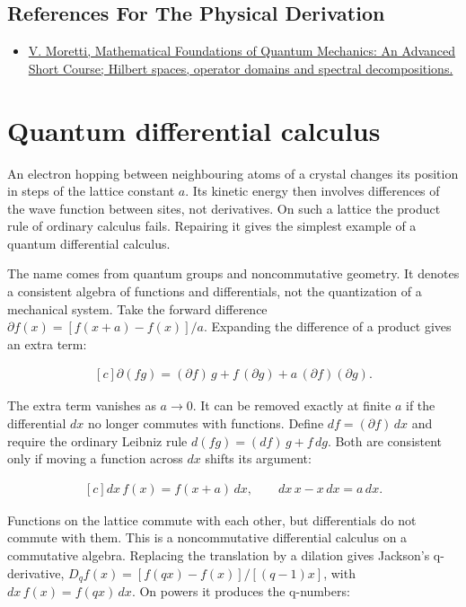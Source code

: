 \documentclass[11pt,oneside]{book}
\newenvironment{centeredalign}{\[\begin{gathered}[c]}{\end{gathered}\]}
\begin{document}
\subsection*{References For The Physical Derivation}
\begin{itemize}
\item \href{https://arxiv.org/abs/1508.06951}{V. Moretti, Mathematical Foundations of Quantum Mechanics: An Advanced Short Course; Hilbert spaces, operator domains and spectral decompositions.}
\end{itemize}





\clearpage

\section{Quantum differential calculus}

\label{topic:quantum-differential-calculus}

An electron hopping between neighbouring atoms of a crystal changes its position in steps of the lattice constant \(a\). Its kinetic energy then involves differences of the wave function between sites, not derivatives. On such a lattice the product rule of ordinary calculus fails. Repairing it gives the simplest example of a quantum differential calculus.

The name comes from quantum groups and noncommutative geometry. It denotes a consistent algebra of functions and differentials, not the quantization of a mechanical system. Take the forward difference \(\partial f(x)=[f(x+a)-f(x)]/a\). Expanding the difference of a product gives an extra term:

\begin{centeredalign}
\partial(fg)=(\partial f)\,g+f\,(\partial g)+a\,(\partial f)(\partial g).
\end{centeredalign}

The extra term vanishes as \(a\to0\). It can be removed exactly at finite \(a\) if the differential \(dx\) no longer commutes with functions. Define \(df=(\partial f)\,dx\) and require the ordinary Leibniz rule \(d(fg)=(df)\,g+f\,dg\). Both are consistent only if moving a function across \(dx\) shifts its argument:

\begin{centeredalign}
dx\,f(x)=f(x+a)\,dx,\qquad dx\,x-x\,dx=a\,dx.
\end{centeredalign}

Functions on the lattice commute with each other, but differentials do not commute with them. This is a noncommutative differential calculus on a commutative algebra. Replacing the translation by a dilation gives Jackson's q-derivative, \(D_qf(x)=[f(qx)-f(x)]/[(q-1)x]\), with \(dx\,f(x)=f(qx)\,dx\). On powers it produces the q-numbers:
\end{document}
